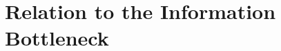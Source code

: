 \documentclass[12pt]{article}
\begin{document}














\section{Relation to the Information Bottleneck}
\end{document}
